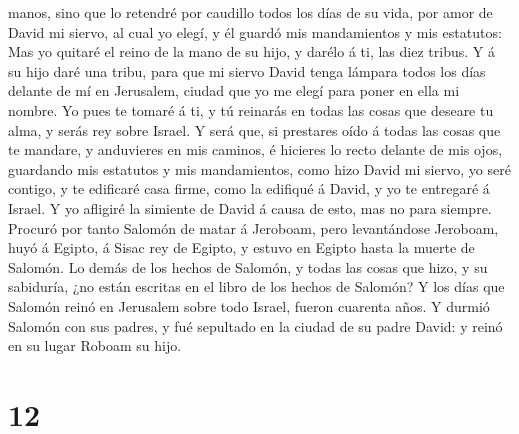 manos, sino que lo retendré por caudillo todos los días de su vida, por
amor de David mi siervo, al cual yo elegí, y él guardó mis mandamientos
y mis estatutos:  Mas yo quitaré el reino de la mano de su
hijo, y darélo á ti, las diez tribus.  Y á su hijo daré una
tribu, para que mi siervo David tenga lámpara todos los días delante de
mí en Jerusalem, ciudad que yo me elegí para poner en ella mi nombre.
 Yo pues te tomaré á ti, y tú reinarás en todas las cosas
que deseare tu alma, y serás rey sobre Israel.  Y será que,
si prestares oído á todas las cosas que te mandare, y anduvieres en mis
caminos, é hicieres lo recto delante de mis ojos, guardando mis
estatutos y mis mandamientos, como hizo David mi siervo, yo seré
contigo, y te edificaré casa firme, como la edifiqué á David, y yo te
entregaré á Israel.  Y yo afligiré la simiente de David á
causa de esto, mas no para siempre.  Procuró por tanto
Salomón de matar á Jeroboam, pero levantándose Jeroboam, huyó á Egipto,
á Sisac rey de Egipto, y estuvo en Egipto hasta la muerte de Salomón.
 Lo demás de los hechos de Salomón, y todas las cosas que
hizo, y su sabiduría, ¿no están escritas en el libro de los hechos de
Salomón?  Y los días que Salomón reinó en Jerusalem sobre
todo Israel, fueron cuarenta años.  Y durmió Salomón con
sus padres, y fué sepultado en la ciudad de su padre David: y reinó en
su lugar Roboam su hijo.

\hypertarget{section-11}{%
\section{12}\label{section-11}}

